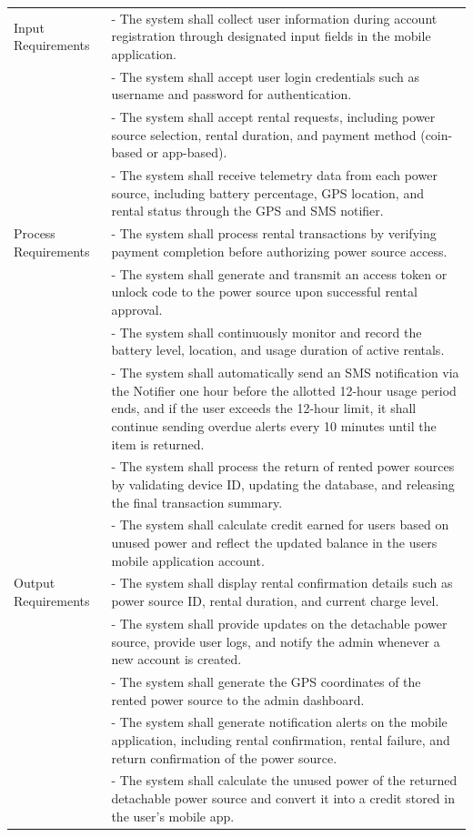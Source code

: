 {\begin{longtable}{| p{4cm} | p{9cm} |}
	Input Requirements & - The system shall collect user information during account registration through designated input fields in the mobile application. \\
	& - The system shall accept user login credentials such as username and password for authentication. \\
	& - The system shall accept rental requests, including power source selection, rental duration, and payment method (coin-based or app-based).\\
	& - The system shall receive telemetry data from each power source, including battery percentage, GPS location, and rental status through the GPS and SMS notifier. \\
	\hline
	
	Process Requirements & - The system shall process rental transactions by verifying payment completion before authorizing power source access. \\
	& - The system shall generate and transmit an access token or unlock code to the power source upon successful rental approval. \\
	& - The system shall continuously monitor and record the battery level, location, and usage duration of active rentals. \\
	& - The system shall automatically send an SMS notification via the Notifier one hour before the allotted 12-hour usage period ends, and if the user exceeds the 12-hour limit, it shall continue sending overdue alerts every 10 minutes until the item is returned. \\
	& - The system shall process the return of rented power sources by validating device ID, updating the database, and releasing the final transaction summary. \\
	& - The system shall calculate credit earned for users based on unused power and reflect the updated balance in the users mobile application account. \\
	\hline
	
	Output Requirements & - The system shall display rental confirmation details such as power source ID, rental duration, and current charge level. \\
	& - The system shall provide updates on the detachable power source, provide user logs, and notify the admin whenever a new account is created. \\
	& - The system shall generate the GPS coordinates of the rented power source to the admin dashboard. \\
	& - The system shall generate notification alerts on the mobile application, including rental confirmation, rental failure, and return confirmation of the power source.  \\
	& - The system shall calculate the unused power of the returned detachable power source and convert it into a credit stored in the user’s mobile app. \\
	\hline
	

\end{longtable}}
